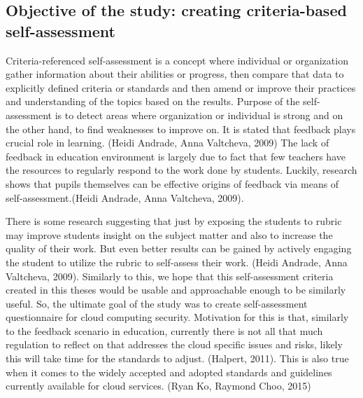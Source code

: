 \documentclass{article}
\begin{document}
\subsection{Objective of the study: creating criteria-based self-assessment}
Criteria-referenced self-assessment is a concept where individual or organization gather information about their abilities or progress, then compare that data to explicitly defined criteria or standards and then amend or improve their practices and understanding of the topics based on the results.
Purpose of the self-assessment is to detect areas where organization or individual is strong and on the other hand, to find weaknesses to improve on. It is stated that feedback plays crucial role in learning. (Heidi Andrade, Anna Valtcheva, 2009)
The lack of feedback in education environment is largely due to fact that few teachers have the resources to regularly respond to the work done by students. Luckily, research shows that pupils themselves can be effective origins of feedback via means of self-assessment.(Heidi Andrade, Anna Valtcheva, 2009).
\par
There is some research suggesting that just by exposing the students to rubric may improve students insight on the subject matter and also to increase the quality of their work. But even better results can be gained by actively engaging the student to utilize the rubric to self-assess their work. (Heidi Andrade, Anna Valtcheva, 2009). Similarly to this, we hope that this self-assessment criteria created in this theses would be usable and approachable enough to be similarly useful. 
So, the ultimate goal of the study was to create self-assessment questionnaire for cloud computing security. Motivation for this is that, similarly to the feedback scenario in education, currently there is not all that much regulation to reflect on that addresses the cloud specific issues and risks, likely this will take time for the standards to adjust. (Halpert, 2011). This is also true when it comes to the widely accepted and adopted standards and guidelines currently available for cloud services. (Ryan Ko, Raymond Choo, 2015)
\end{document}

